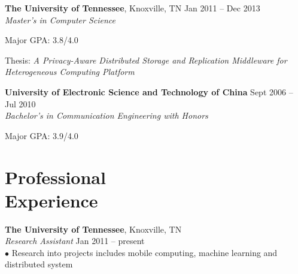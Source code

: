 \documentclass[margin, centered]{resume}
\begin{document}
\begin{resume}
    \textbf{The University of Tennessee}, Knoxville, TN \hfill Jan 2011 -- Dec 2013\vspace{0mm}\\\vspace{0mm}%
    \emph{Master's in Computer Science} \vspace{-1mm}\\\vspace{-2mm}%
    \begin{list2}
        \item Major GPA: 3.8/4.0
        \item Thesis: \emph{A Privacy-Aware Distributed Storage and Replication Middleware for Heterogeneous Computing Platform}
    \end{list2}\vspace{-1mm}
    \textbf{University of Electronic Science and Technology of China} \hfill Sept 2006 -- Jul 2010\vspace{0mm}\\\vspace{0mm}%
	\emph{Bachelor's in Communication Engineering with Honors} \vspace{-1mm}\\\vspace{-2mm}%
	\begin{list2}
		\item Major GPA: 3.9/4.0
	\end{list2}\vspace{-1mm}

    \section{\mysidestyle Professional\\Experience}

    \textbf{The University of Tennessee}, Knoxville, TN \\\vspace{0mm}%
    \emph{Research Assistant} \hfill Jan 2011 -- present\vspace{0mm}\\
    $\bullet$ Research into projects includes mobile computing, machine learning and distributed system\vspace{-6mm}\\


\end{resume}
\end{document}
